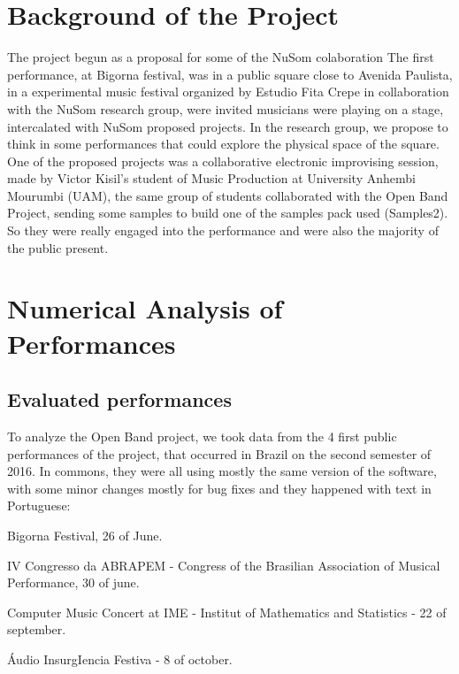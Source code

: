 \documentclass{aes2e}
\begin{document}

\section{Background of the Project}
The project begun as a proposal for some of the NuSom colaboration The first performance, at Bigorna festival, was in a public square close to Avenida Paulista, in a experimental music festival organized by Estudio Fita Crepe in collaboration with the NuSom research group, were invited musicians were playing on a stage, intercalated with NuSom proposed projects. In the research group, we propose to think in some performances that could explore the physical space of the square. One of the proposed projects was a collaborative electronic improvising session, made by Victor Kisil's student of Music Production at University Anhembi Mourumbi (UAM), the same group of students collaborated with the Open Band Project, sending some samples to build one of the samples pack used (Samples2). So they were really engaged into the performance and were also the majority of the public present.


\section{Numerical Analysis of Performances}

\subsection{Evaluated performances}

To analyze the Open Band project, we took data from the 4 first public performances of the project, that occurred in Brazil on the second semester of 2016. In commons, they were all using mostly the same version of the software, with some minor changes mostly for bug fixes and they happened with text in Portuguese:
\begin{arabiclist}
\item{}Bigorna Festival, 26 of June.
\item{}IV Congresso da ABRAPEM - Congress of the Brasilian Association of Musical Performance, 30 of june.
\item{}Computer Music Concert at IME - Institut of Mathematics and Statistics - 22 of september.
\item{}Áudio InsurgIencia Festiva - 8 of october.
\end{arabiclist}
\end{document}
